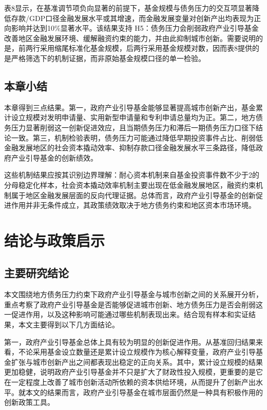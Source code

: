 \documentclass[UTF8,a4paper,zihao=5,fontset=fandol]{ctexart}
\begin{document}
表8显示，在基准调节项负向显著的前提下，基金规模与债务压力的交互项显著降低存款/GDP口径金融发展水平或其增速，而金融发展变量对创新产出均表现为正向影响并达到10\%显著水平。该结果支持 H5：债务压力会削弱政府产业引导基金改善地区金融发展环境、缓解融资约束的能力，并由此抑制城市创新。需要说明的是，前两行采用缩尾标准化基金规模，后两行采用基金规模对数，因而表8提供的是严格筛选下的机制证据，而非原始基金规模口径的单一检验。

\subsection{本章小结}

本章得到三点结果。第一，政府产业引导基金能够显著提高城市创新产出，基金累计设立规模对发明申请量、实用新型申请量和专利申请总量均为正。第二，地方债务压力显著削弱这一创新促进效应，且当期债务压力和滞后一期债务压力口径下结论一致。第三，机制检验表明，债务压力可能通过降低早期投资事件占比、削弱低金融发展地区的社会资本撬动效率、抑制存款口径金融发展水平三条路径，降低政府产业引导基金的创新绩效。

这些机制结果应按其识别边界理解：耐心资本机制来自基金投资事件数不少于2的分母稳定化样本，社会资本撬动效率机制主要出现在低金融发展地区，融资约束机制属于地区金融发展层面的反向代理证据。总体而言，政府产业引导基金的创新促进作用并非无条件成立，其政策绩效取决于地方债务约束和地区资本市场环境。




\section{结论与政策启示}

\subsection{主要研究结论}

本文围绕地方债务压力约束下政府产业引导基金与城市创新之间的关系展开分析，重点考察了政府产业引导基金是否能够促进城市创新、地方债务压力是否会削弱这一促进作用，以及这种影响可能通过哪些机制表现出来。结合现有样本和实证结果，本文主要得到以下几方面结论。

第一，政府产业引导基金总体上具有较为明显的创新促进作用。从基准回归结果来看，不论采用基金设立数量还是累计设立规模作为核心解释变量，政府产业引导基金扩张与城市创新产出之间都表现出稳定的正向关系。其中，累计设立规模的结果更加稳健，说明政府产业引导基金并不只是扩大了财政性投入规模，更重要的是它在一定程度上改善了城市创新活动所依赖的资本供给环境，从而提升了创新产出水平。就本文的结果而言，政府产业引导基金在城市层面仍然是一种具有积极作用的创新政策工具。
\end{document}
